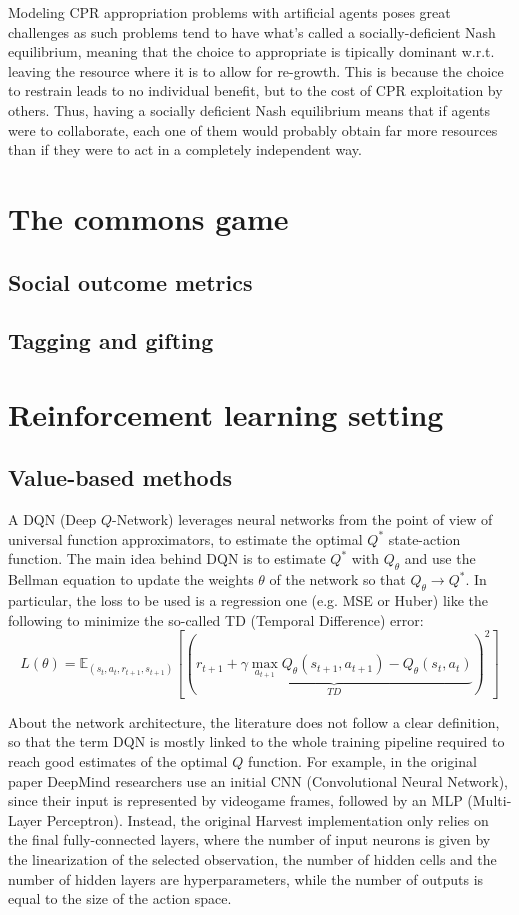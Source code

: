 \documentclass{article}
\begin{document}
Modeling CPR appropriation problems with artificial agents poses great challenges as such problems tend to have what's called a socially-deficient Nash equilibrium, meaning that the choice to appropriate is tipically dominant w.r.t. leaving the resource where it is to allow for re-growth. This is because the choice to restrain leads to no individual benefit, but to the cost of CPR exploitation by others. Thus, having a socially deficient Nash equilibrium means that if agents were to collaborate, each one of them would probably obtain far more resources than if they were to act in a completely independent way.

\section{The commons game}

\subsection{Social outcome metrics}

\subsection{Tagging and gifting}

\section{Reinforcement learning setting}

\subsection{Value-based methods}
A DQN (Deep $Q$-Network) \cite{dqn} leverages neural networks from the point of view of universal function approximators, to estimate the optimal $Q^*$ state-action function. The main idea behind DQN is to estimate $Q^*$ with $Q_\theta$ and use the Bellman equation to update the weights $\theta$ of the network so that $Q_\theta\rightarrow Q^*$. In particular, the loss to be used is a regression one (e.g. MSE or Huber) like the following to minimize the so-called TD (Temporal Difference) error:
$$
L(\theta)=\mathbb{E}_{(s_t,a_t,r_{t+1},s_{t+1})}\left[\left(\underbrace{r_{t+1}+\gamma\max_{a_{t+1}}Q_\theta(s_{t+1}, a_{t+1}) - Q_\theta(s_t, a_t)}_{TD}\right)^2\right]
$$

About the network architecture, the literature does not follow a clear definition, so that the term DQN is mostly linked to the whole training pipeline required to reach good estimates of the optimal $Q$ function. For example, in the original paper \cite{dqn} DeepMind researchers use an initial CNN (Convolutional Neural Network), since their input is represented by videogame frames, followed by an MLP (Multi-Layer Perceptron). Instead, the original Harvest implementation only relies on the final fully-connected layers, where the number of input neurons is given by the linearization of the selected observation, the number of hidden cells and the number of hidden layers are hyperparameters, while the number of outputs is equal to the size of the action space. 
\end{document}
